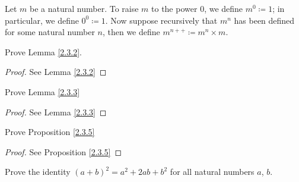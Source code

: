 \begin{definition}\label{2.3.11}
    Let \(m\) be a natural number.
    To raise \(m\) to the power \(0\), we define \(m^0 \coloneqq 1\); in particular, we define \(0^0 \coloneqq 1\).
    Now suppose recursively that \(m^n\) has been defined for some natural number \(n\), then we define \(m^{n++} \coloneqq m^n \times m\).
\end{definition}

\exercisesection

\begin{exercise}\label{ex 2.3.1}
    Prove Lemma \ref{2.3.2}.
\end{exercise}

\begin{proof}
    See Lemma \ref{2.3.2}
\end{proof}

\begin{exercise}\label{ex 2.3.2}
    Prove Lemma \ref{2.3.3}
\end{exercise}

\begin{proof}
    See Lemma \ref{2.3.3}
\end{proof}

\begin{exercise}\label{ex 2.3.3}
    Prove Proposition \ref{2.3.5}
\end{exercise}

\begin{proof}
    See Proposition \ref{2.3.5}
\end{proof}

\begin{exercise}\label{ex 2.3.4}
    Prove the identity \((a + b)^2 = a^2 + 2ab + b^2\) for all natural numbers \(a\), \(b\).
\end{exercise}


